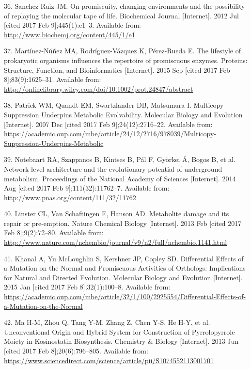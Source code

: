 \documentclass[12pt,twoside]{reedthesis}
\begin{document}
  \hypertarget{ref-sanchez-ruiz_promiscuity_2012}{}
  36. Sanchez-Ruiz JM. On promiscuity, changing environments and the
  possibility of replaying the molecular tape of life. Biochemical Journal
  {[}Internet{]}. 2012 Jul {[}cited 2017 Feb 9{]};445(1):e1--3. Available
  from: \url{http://www.biochemj.org/content/445/1/e1}
  
  \hypertarget{ref-martinez-nunez_lifestyle_2015}{}
  37. Martínez-Núñez MA, Rodríguez-Vázquez K, Pérez-Rueda E. The lifestyle
  of prokaryotic organisms influences the repertoire of promiscuous
  enzymes. Proteins: Structure, Function, and Bioinformatics
  {[}Internet{]}. 2015 Sep {[}cited 2017 Feb 8{]};83(9):1625--31.
  Available from:
  \url{http://onlinelibrary.wiley.com/doi/10.1002/prot.24847/abstract}
  
  \hypertarget{ref-patrick_multicopy_2007}{}
  38. Patrick WM, Quandt EM, Swartzlander DB, Matsumura I. Multicopy
  Suppression Underpins Metabolic Evolvability. Molecular Biology and
  Evolution {[}Internet{]}. 2007 Dec {[}cited 2017 Feb
  9{]};24(12):2716--22. Available from:
  \url{https://academic.oup.com/mbe/article/24/12/2716/978039/Multicopy-Suppression-Underpins-Metabolic}
  
  \hypertarget{ref-notebaart_network-level_2014}{}
  39. Notebaart RA, Szappanos B, Kintses B, Pál F, Györkei Á, Bogos B, et
  al. Network-level architecture and the evolutionary potential of
  underground metabolism. Proceedings of the National Academy of Sciences
  {[}Internet{]}. 2014 Aug {[}cited 2017 Feb 9{]};111(32):11762--7.
  Available from: \url{http://www.pnas.org/content/111/32/11762}
  
  \hypertarget{ref-linster_metabolite_2013}{}
  40. Linster CL, Van Schaftingen E, Hanson AD. Metabolite damage and its
  repair or pre-emption. Nature Chemical Biology {[}Internet{]}. 2013 Feb
  {[}cited 2017 Feb 8{]};9(2):72--80. Available from:
  \url{http://www.nature.com/nchembio/journal/v9/n2/full/nchembio.1141.html}
  
  \hypertarget{ref-khanal_differential_2015}{}
  41. Khanal A, Yu McLoughlin S, Kershner JP, Copley SD. Differential
  Effects of a Mutation on the Normal and Promiscuous Activities of
  Orthologs: Implications for Natural and Directed Evolution. Molecular
  Biology and Evolution {[}Internet{]}. 2015 Jan {[}cited 2017 Feb
  8{]};32(1):100--8. Available from:
  \url{https://academic.oup.com/mbe/article/32/1/100/2925554/Differential-Effects-of-a-Mutation-on-the-Normal}
  
  \hypertarget{ref-ma_unconventional_2013}{}
  42. Ma H-M, Zhou Q, Tang Y-M, Zhang Z, Chen Y-S, He H-Y, et al.
  Unconventional Origin and Hybrid System for Construction of
  Pyrrolopyrrole Moiety in Kosinostatin Biosynthesis. Chemistry \& Biology
  {[}Internet{]}. 2013 Jun {[}cited 2017 Feb 8{]};20(6):796--805.
  Available from:
  \url{https://www.sciencedirect.com/science/article/pii/S1074552113001701}
  
\end{document}
